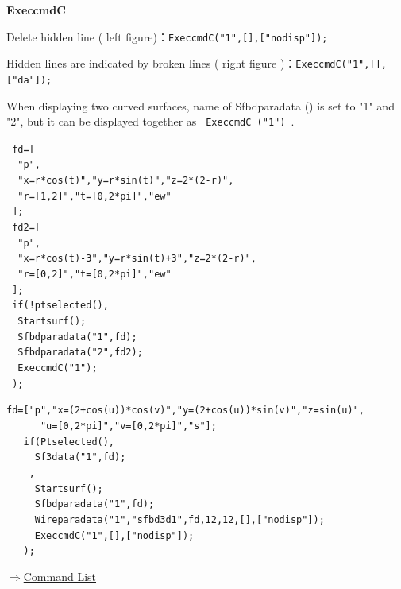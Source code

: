 \documentclass[papersize,a4paper,12pt]{article}
\newenvironment{cmd}[2]{
\hypertarget{#2}{}
\begin{center}{\bf\large #1}\end{center}
\begin{description}
}{
\end{description}
\begin{flushright} \hyperlink{functionlist}{$\Rightarrow$Command List}\end{flushright}
}
\begin{document}
\begin{cmd}{ExeccmdC}{execcmdc}
Delete hidden line ( left figure)：\verb|ExeccmdC("1",[],["nodisp"]);|
 
Hidden lines are indicated by broken lines ( right figure )：\verb|ExeccmdC("1",[],["da"]);|

      \begin{center}    \end{center}
      
When displaying two curved surfaces, name of Sfbdparadata () is set to "1" and "2", but it can be displayed together as \verb | ExeccmdC ("1") |.

\verb| fd=[|\\
\verb|  "p",|\\
\verb|  "x=r*cos(t)","y=r*sin(t)","z=2*(2-r)",|\\
\verb|  "r=[1,2]","t=[0,2*pi]","ew"|\\
\verb| ];|\\
\verb| fd2=[|\\
\verb|  "p",|\\
\verb|  "x=r*cos(t)-3","y=r*sin(t)+3","z=2*(2-r)",|\\
\verb|  "r=[0,2]","t=[0,2*pi]","ew"|\\
\verb| ];|\\
\verb| if(!ptselected(),|\\
\verb|  Startsurf(); |\\
\verb|  Sfbdparadata("1",fd);|\\
\verb|  Sfbdparadata("2",fd2);|\\
\verb|  ExeccmdC("1");|\\
\verb| );|\\

\begin{center}   \end{center}

\vspace{\baselineskip}
\verb|fd=["p","x=(2+cos(u))*cos(v)","y=(2+cos(u))*sin(v)","z=sin(u)",|\\
\verb|      "u=[0,2*pi]","v=[0,2*pi]","s"];|\\
\verb|   if(Ptselected(),|\\
\verb|     Sf3data("1",fd);|\\
\verb|    ,|\\
\verb|     Startsurf();|\\
\verb|     Sfbdparadata("1",fd);|\\
\verb|     Wireparadata("1","sfbd3d1",fd,12,12,[],["nodisp"]);|\\
\verb|     ExeccmdC("1",[],["nodisp"]);|\\
\verb|   );|\\

\begin{center}  \end{center}

\end{cmd}
\end{document}
